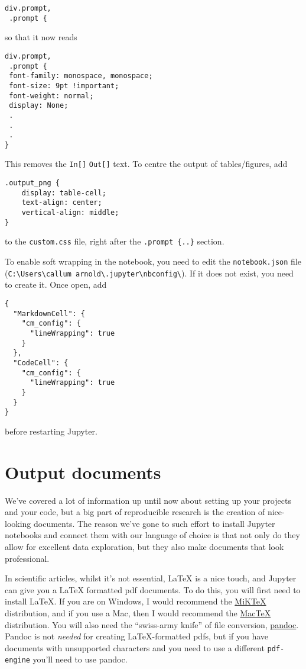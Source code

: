 \documentclass[]{book}
\begin{document}
\begin{verbatim}
div.prompt,
 .prompt {
\end{verbatim}

so that it now reads

\begin{verbatim}
div.prompt,
 .prompt {
 font-family: monospace, monospace;
 font-size: 9pt !important;
 font-weight: normal;
 display: None;
 .
 .
 .
}
\end{verbatim}

This removes the \texttt{In{[}{]}} \texttt{Out{[}{]}} text. To centre the output of tables/figures, add

\begin{verbatim}
.output_png {
    display: table-cell;
    text-align: center;
    vertical-align: middle;
}
\end{verbatim}

to the \texttt{custom.css} file, right after the \texttt{.prompt\ \{..\}} section.

To enable soft wrapping in the notebook, you need to edit the \texttt{notebook.json} file (\texttt{C:\textbackslash{}Users\textbackslash{}callum\ arnold\textbackslash{}.jupyter\textbackslash{}nbconfig\textbackslash{}}). If it does not exist, you need to create it. Once open, add

\begin{verbatim}
{
  "MarkdownCell": {
    "cm_config": {
      "lineWrapping": true
    }
  },
  "CodeCell": {
    "cm_config": {
      "lineWrapping": true
    }
  }
}
\end{verbatim}

before restarting Jupyter.

\hypertarget{output-documents}{%
\section{Output documents}\label{output-documents}}

We've covered a lot of information up until now about setting up your projects and your code, but a big part of reproducible research is the creation of nice-looking documents. The reason we've gone to such effort to install Jupyter notebooks and connect them with our language of choice is that not only do they allow for excellent data exploration, but they also make documents that look professional.

In scientific articles, whilst it's not essential, LaTeX is a nice touch, and Jupyter can give you a LaTeX formatted pdf documents. To do this, you will first need to install LaTeX. If you are on Windows, I would recommend the \href{https://miktex.org/download}{MiKTeX} distribution, and if you use a Mac, then I would recommend the \href{http://www.tug.org/mactex/mactex-download.html}{MacTeX} distribution. You will also need the ``swiss-army knife'' of file conversion, \href{https://pandoc.org/installing.html}{pandoc}. Pandoc is not \emph{needed} for creating LaTeX-formatted pdfs, but if you have documents with unsupported characters and you need to use a different \texttt{pdf-engine} you'll need to use pandoc.
\end{document}
